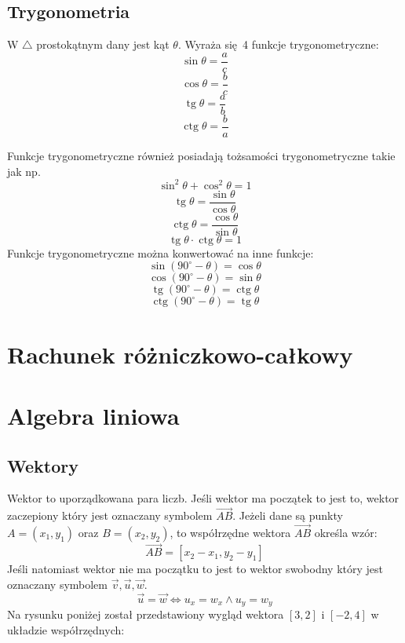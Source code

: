 \documentclass[12pt, a4paper]{article}
\DeclareMathOperator{\tg}{tg}
\DeclareMathOperator{\ctg}{ctg}
\begin{document}
\subsection{Trygonometria}
W $\triangle$ prostokątnym dany jest kąt $\theta$. Wyraża się 4 funkcje trygonometryczne:
$$\sin\theta=\frac{a}{c}$$
$$\cos\theta=\frac{b}{c}$$
$$\tg\theta=\frac{a}{b}$$
$$\ctg\theta=\frac{b}{a}$$
\begin{center}
\end{center}
Funkcje trygonometryczne również posiadają tożsamości trygonometryczne takie jak np.
$$\sin^2\theta+\cos^2\theta = 1$$
$$\tg\theta=\frac{\sin\theta}{\cos\theta}$$
$$\ctg\theta=\frac{\cos\theta}{\sin\theta}$$
$$\tg\theta\cdot\ctg\theta=1$$
Funkcje trygonometryczne można konwertować na inne funkcje:
$$\sin(90^{\circ}-\theta)=\cos\theta$$
$$\cos(90^{\circ}-\theta)=\sin\theta$$
$$\tg(90^{\circ}-\theta)=\ctg\theta$$
$$\ctg(90^{\circ}-\theta)=\tg\theta$$
\section{Rachunek różniczkowo-całkowy}
\section{Algebra liniowa}
\subsection{Wektory}
Wektor to uporządkowana para liczb. Jeśli wektor ma początek to jest to, wektor
zaczepiony który jest oznaczany symbolem $\overrightarrow{AB}$. Jeżeli dane są punkty
$A = (x_1,y_1)$ oraz $B = (x_2,y_2)$,
to współrzędne wektora $\overrightarrow{AB}$ określa wzór: $$\overrightarrow{AB} = [x_2-x_1,y_2-y_1]$$
Jeśli natomiast wektor nie ma początku to jest to wektor swobodny który
jest oznaczany symbolem $\overrightarrow{v}, \overrightarrow{u}, \overrightarrow{w}$.
$$\overrightarrow{u} = \overrightarrow{w} \Longleftrightarrow u_x = w_x \wedge u_y = w_y$$
Na rysunku poniżej został przedstawiony wygląd wektora $[3,2]$ i $[-2,4]$ w układzie współrzędnych:
\end{document}

